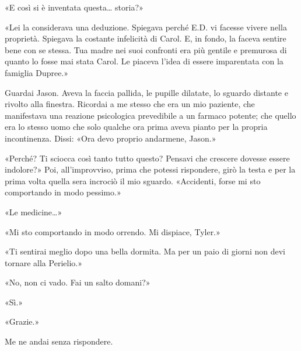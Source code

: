 «E così si è inventata questa\ldots{} storia?»

«Lei la considerava una deduzione. Spiegava perché E.D. vi facesse
vivere nella proprietà. Spiegava la costante infelicità di Carol. E, in
fondo, la faceva sentire bene con se stessa. Tua madre nei suoi
confronti era più gentile e premurosa di quanto lo fosse mai stata
Carol. Le piaceva l'idea di essere imparentata con la famiglia Dupree.»

Guardai Jason. Aveva la faccia pallida, le pupille dilatate, lo sguardo
distante e rivolto alla finestra. Ricordai a me stesso che era un mio
paziente, che manifestava una reazione psicologica prevedibile a un
farmaco potente; che quello era lo stesso uomo che solo qualche ora
prima aveva pianto per la propria incontinenza. Dissi: «Ora devo proprio
andarmene, Jason.»

«Perché? Ti sciocca così tanto tutto questo? Pensavi che crescere
dovesse essere indolore?» Poi, all'improvviso, prima che potessi
rispondere, girò la testa e per la prima volta quella sera incrociò il
mio sguardo. «Accidenti, forse mi sto comportando in modo pessimo.»

«Le medicine\ldots»

«Mi sto comportando in modo orrendo. Mi dispiace, Tyler.»

«Ti sentirai meglio dopo una bella dormita. Ma per un paio di giorni non
devi tornare alla Perielio.»

«No, non ci vado. Fai un salto domani?»

«Sì.»

«Grazie.»

Me ne andai senza rispondere.
